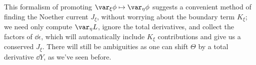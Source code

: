\documentclass[a4paper
	,10pt
]{article}
\begin{document}
	\newparagraph
	This formalism of promoting $
		\var_\xi \phi
		\mapsto \var_\eta \phi
	$ suggests a convenient method of finding the Noether current $J_\xi$, without worrying about the boundary term $K_\xi$; we need only compute $\var_\eta L$, ignore the total derivatives, and collect the factors of $\dd{\epsilon}$, which will automatically include $K_\xi$ contributions and give us a conserved $J_\xi$. There will still be ambiguities as one can shift $\Theta$ by a total derivative $\dd{Y}$, as we've seen before.
	
	
	
	
	
\vspace{1.2\baselineskip}
\pagebreak[4]
\raggedright
\printbibliography[%
	,heading = bibintoc
]
\end{document}
